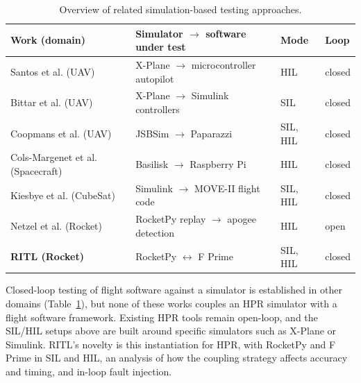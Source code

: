 \begin{table}[t]
\centering
\caption{Overview of related simulation-based testing approaches.}
\label{tab:related}
\footnotesize
\setlength{\tabcolsep}{3pt}
\begin{tabular}{@{}p{0.95in}p{1.55in}p{0.45in}p{0.35in}@{}}
\toprule
\textbf{Work (domain)} & \textbf{Simulator $\rightarrow$ software under test} & \textbf{Mode} & \textbf{Loop} \\
\midrule
Santos et al. \cite{santos-hil-uav-autopilot} (UAV) & X-Plane $\rightarrow$ microcontroller autopilot & HIL & closed \\
Bittar et al. \cite{bittar-guidance-sil-uav-xplane-simulink} (UAV) & X-Plane $\rightarrow$ Simulink controllers & SIL & closed \\
Coopmans et al. \cite{coopmans-sil-hil-verification-uav} (UAV) & JSBSim $\rightarrow$ Paparazzi & SIL, HIL & closed \\
Cols-Margenet et al. \cite{colsmargenet2017modular} (Spacecraft) & Basilisk $\rightarrow$ Raspberry Pi & HIL & closed \\
Kiesbye et al. \cite{kiesbye2019-moveII-cubsat} (CubeSat) & Simulink $\rightarrow$ MOVE-II flight code & SIL, HIL & closed \\
Netzel et al. \cite{netzel-rocketpy-hil} (Rocket) & RocketPy replay $\rightarrow$ apogee detection & HIL & open \\
\textbf{RITL (Rocket)} & RocketPy $\leftrightarrow$ F Prime & SIL, HIL & closed \\
\bottomrule
\end{tabular}
\end{table}

Closed-loop testing of flight software against a simulator is established in other domains (Table~\ref{tab:related}), but none of these works couples an HPR simulator with a flight software framework. Existing HPR tools remain open-loop, and the SIL/HIL setups above are built around specific simulators such as X-Plane or Simulink. RITL's novelty is this instantiation for HPR, with RocketPy and F Prime in SIL and HIL, an analysis of how the coupling strategy affects accuracy and timing, and in-loop fault injection.
